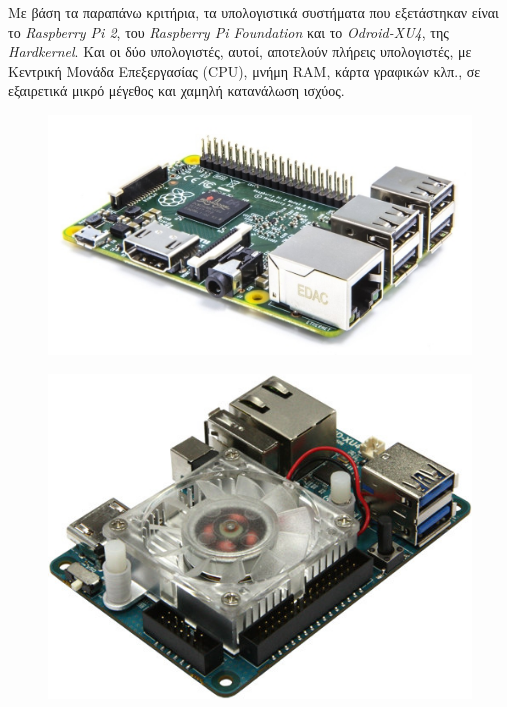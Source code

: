 \bigskip
Με βάση τα παραπάνω κριτήρια, τα υπολογιστικά συστήματα που εξετάστηκαν είναι το \textit{Raspberry Pi 2}, του \textit{Raspberry Pi Foundation} και το \textit{Odroid-XU4}, της \textit{Hardkernel}. Και οι δύο υπολογιστές, αυτοί, αποτελούν πλήρεις υπολογιστές, με Κεντρική Μονάδα Επεξεργασίας (CPU), μνήμη RAM, κάρτα γραφικών κλπ., σε εξαιρετικά μικρό μέγεθος και χαμηλή κατανάλωση ισχύος.

\begin{figure}[!ht]
	\begin{minipage}[t]{.49\textwidth}
 		\centering
		\includegraphics[width=0.6\linewidth]{Chapters/Chapter2/Figures/rpi2.jpg}
		\label{fig:rpi2}
	\end{minipage}
	\begin{minipage}[t]{.5\textwidth}		
		\centering
		\includegraphics[width=0.5\linewidth]{Chapters/Chapter2/Figures/odroid-xu4.jpg}
		\label{fig:odroid-xu4}
	\end{minipage}
\end{figure}

